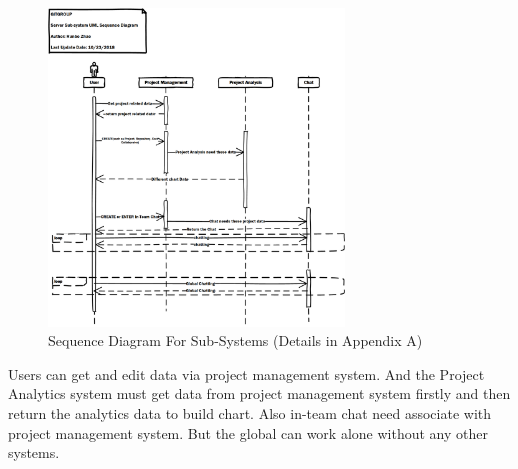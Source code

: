 \documentclass[12pt,a4paper]{report}
\begin{document}
\begin{figure}[H]
	\centering
	\includegraphics[width=0.7\textwidth]{./pics/SubSysSequenceDiagram.png}
	\caption{Sequence Diagram For Sub-Systems (Details in Appendix A)}
\end{figure}
Users can get and edit data via project management system. And the Project Analytics system must get data from project management system firstly and then return the analytics data to build chart. Also in-team chat need associate with project management system. But the global can work alone without any other systems.
\end{document}
